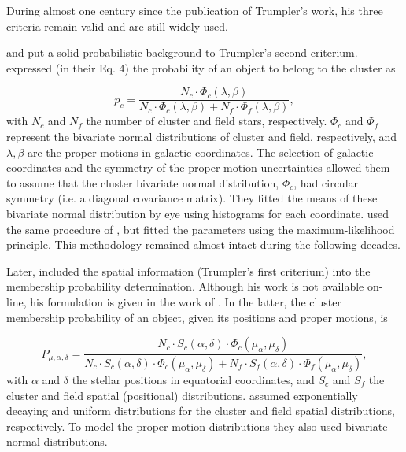 During almost one century since the publication of Trumpler's work, his three criteria remain valid and are still widely used.
 
\citet{Vasilevskis1958} and \citet{Sanders1971} put a solid probabilistic background to Trumpler's second criterium. \citet{Vasilevskis1958} expressed (in their Eq. 4) the probability of an object to belong to the cluster as 

\begin{equation}
p_c = \frac{N_c \cdot \Phi_c(\lambda,\beta)}{N_c \cdot \Phi_c(\lambda,\beta) + N_f \cdot \Phi_f(\lambda,\beta)}, \nonumber
\end{equation}
with $N_c$ and $N_f$ the number of cluster and field stars, respectively. $\Phi_c$ and $\Phi_f$ represent the bivariate normal distributions of cluster and field, respectively, and $\lambda,\beta$ are the proper motions in galactic coordinates. The selection of galactic coordinates and the symmetry of the proper motion uncertainties allowed them to assume that the cluster bivariate normal distribution, $\Phi_c$,  had circular symmetry (i.e. a diagonal covariance matrix). They fitted the means of these bivariate normal distribution by eye using histograms for each coordinate. \citet{Sanders1971} used the same procedure of  \citet{Vasilevskis1958}, but fitted the parameters using the maximum-likelihood principle. This methodology remained almost intact during the following decades. 

Later, \citet{1979PVatO...1....1D} included the spatial information (Trumpler's first criterium) into the membership probability determination. Although his work is not available on-line, his formulation is given in the work of \citet{1995AJ....109..672K}. In the latter, the cluster membership probability of an object, given its positions and proper motions, is 

\begin{equation}
P_{\mu,\alpha,\delta}= \frac{N_c\cdot S_c(\alpha,\delta)\cdot \Phi_c(\mu_{\alpha},\mu_{\delta})}{N_c\cdot S_c(\alpha,\delta)\cdot \Phi_c(\mu_{\alpha},\mu_{\delta}) +N_f\cdot S_f(\alpha,\delta)\cdot \Phi_f(\mu_{\alpha},\mu_{\delta})}, \nonumber
\end{equation}
with $\alpha$ and $\delta$ the stellar positions in equatorial coordinates, and $S_c$ and $S_f$ the cluster and field spatial (positional) distributions. \citet{1995AJ....109..672K} assumed exponentially decaying and uniform distributions for the cluster and field spatial distributions, respectively. To model the proper motion distributions they also used bivariate normal distributions.

